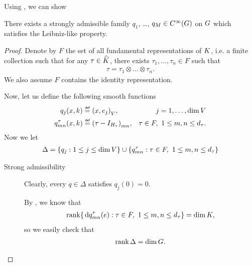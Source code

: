 Using \cite[Lemma 4.4]{RuzhanskyTurunenWirth10}, we can show

\begin{lemma}
    There exists a strongly admissible family $q_1$, \dots, $q_M \in {C^\infty(G)}$ on $G$ which satisfies the Leibniz-like property.
\end{lemma}
\begin{proof}
    Denote by $F$ the set of all fundamental representations of $K$,
    i.e. a finite collection such that for any $\tau \in {\widehat{K}}$,
    there exists $\tau_1, \dots, \tau_n \in F$ such that
    \begin{align*}
        \tau = \tau_1 \otimes \dots \otimes \tau_n.
    \end{align*}
    We also assume $F$ contains the identity representation.

    Now,
    let us define the following smooth functions
    \begin{align*}
        q_j(x, k) &\defeq \ip {x} {e_j}, &j = 1, \dots, \dim \VectorSpace\\
        q^\tau_{m n}(x, k) &\defeq {\left(\tau - \Id {H_\tau}\right)}_{m n},
        &\tau \in F, \ 1 \leq m, n \leq \dimRep \tau.
    \end{align*}
    Now we let
    \begin{align*}
        \Delta = \{q_j : 1 \leq j \leq \dim V\}
        \cup \{q^\tau_{m n} : \tau \in F, \ 1 \leq m, n \leq {d_{\tau}}\}
    \end{align*}

    \begin{description}
        \item [Strong admissibility]
            Clearly, every $q \in \Delta$ satisfies $q_j(0) = 0$.

            By \cite[Lemma 5.11]{Fischer2015},
            we know that
            \begin{align*}
                \operatorname{rank} \{\,\mathrm{d} q^\tau_{m n}(e) : \tau \in F, \ 1 \leq m, n \leq {d_{\tau}}\} = \dim K,
            \end{align*}
            so we easily check that
            \begin{align*}
                \operatorname{rank} \Delta = \dim G.
            \end{align*}


\end{description}
\end{proof}
